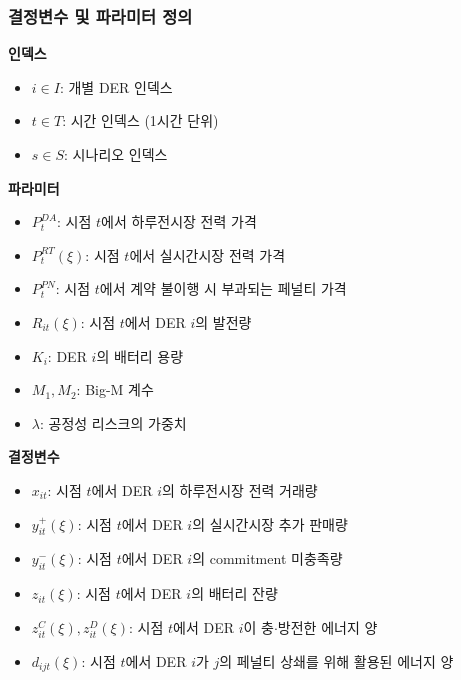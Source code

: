 \documentclass[xcolor=dvipsnames,t,9pt]{beamer}
\begin{document}
{
\begin{frame}[noframenumbering]
    \frametitle{결정변수 및 파라미터 정의}
    \small
    \begin{minipage}[t]{0.37\textwidth}
        \textbf{인덱스}
        \begin{itemize}
            \item $i \in I$: 개별 DER 인덱스
            \item $t \in T$: 시간 인덱스 (1시간 단위)
            \item $s \in S$: 시나리오 인덱스
        \end{itemize}
        \vspace{0.5em}
        \textbf{파라미터}
        \begin{itemize}
            \item $P_t^{DA}$: 시점 $t$에서 하루전시장 전력 가격
            \item $P_t^{RT}(\xi)$: 시점 $t$에서 실시간시장 전력 가격
            \item $P_t^{PN}$: 시점 $t$에서 계약 불이행 시 부과되는 페널티 가격
            \item $R_{it}(\xi)$: 시점 $t$에서 DER $i$의 발전량
            \item $K_i$: DER $i$의 배터리 용량
            \item $M_1, M_2$: Big-M 계수
            \item $\lambda$: 공정성 리스크의 가중치
        \end{itemize}
    \end{minipage}
    \hfill
    \begin{minipage}[t]{0.58\textwidth}
        \textbf{결정변수}
        \begin{itemize}
            \item $x_{it}$: 시점 $t$에서 DER $i$의 하루전시장 전력 거래량
            \item $y_{it}^{+}(\xi)$: 시점 $t$에서 DER $i$의 실시간시장 추가 판매량
            \item $y_{it}^{-}(\xi)$: 시점 $t$에서 DER $i$의 commitment 미충족량
            \item $z_{it}(\xi)$: 시점 $t$에서 DER $i$의 배터리 잔량
            \item $z^C_{it}(\xi), z^D_{it}(\xi)$: 시점 $t$에서 DER $i$이 충$\cdot$방전한 에너지 양
            \item $d_{ijt}(\xi)$: 시점 $t$에서 DER $i$가 $j$의 페널티 상쇄를 위해 활용된 에너지 양

\end{itemize}
\end{minipage}
\end{frame}}
\end{document}
